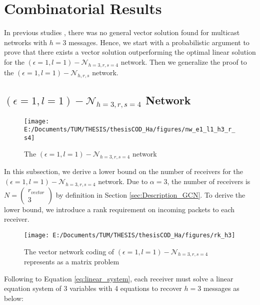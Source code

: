 \chapter{Combinatorial Results} \label{chap:comb_res}

In previous studies \cite{Wachter-Zeh:2018}, there was no general
vector solution found for multicast networks with $h=3$ messages.
Hence, we start with a probabilistic argument to prove that there
exists a vector solution outperforming the optimal linear solution
for the $\left(\epsilon=1,l=1\right)-\mathcal{N}_{h=3,r,s=4}$ network.
Then we generalize the proof to the $\left(\epsilon=1,l=1\right)-\mathcal{N}_{h,r,s}$
network.

\section{$\left(\epsilon=1,l=1\right)-\mathcal{N}_{h=3,r,s=4}$ Network \label{sec:Network_e1l1h3rs4}}

\begin{figure}[H]
\caption{The $(\epsilon=1,l=1)-\mathcal{N}_{h=3,r,s=4}$ network\label{fig:nw_e1_l1_h3_r_s4}}

\texttt{[image: E:/Documents/TUM/THESIS/thesisCOD\_Ha/figures/nw\_e1\_l1\_h3\_r\_s4]}
\end{figure}

In this subsection, we derive a lower bound on the number of receivers
for the $\left(\epsilon=1,l=1\right)-\mathcal{N}_{h=3,r,s=4}$ network.
Due to $\alpha=3$, the number of receivers is $N=\left(\begin{array}{c}
r_{vector}\\
3
\end{array}\right)$ by definition in Section \ref{sec:Description_GCN}. To derive the
lower bound, we introduce a rank requirement on incoming packets to
each receiver. 

\begin{figure}[H]
\caption{The vector network coding of $(\epsilon=1,l=1)-\mathcal{N}_{h=3,r,s=4}$
represents as a matrix problem\label{fig:rk_h3}}

\texttt{[image: E:/Documents/TUM/THESIS/thesisCOD\_Ha/figures/rk\_h3]}
\end{figure}

Following to Equation \ref{eq:linear_system}, each receiver must
solve a linear equation system of 3 variables with 4 equations to
recover $h=3$ messages as below:

